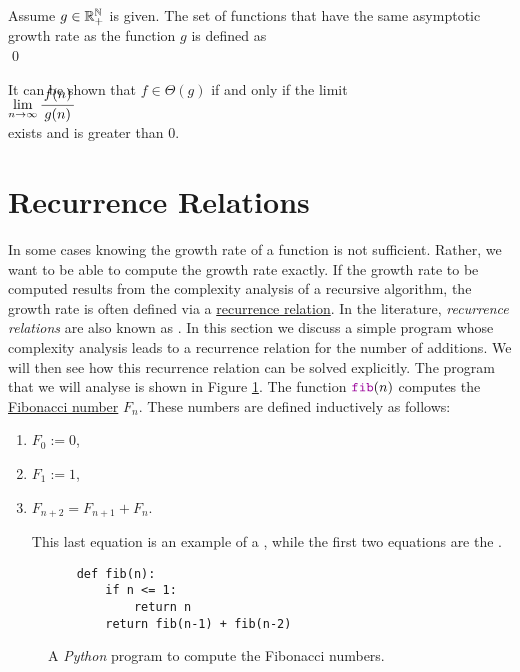 \begin{Definition}[$\Theta(g)$] 
  Assume $g \in {\mathbb R}_+^{{\mathbb N}}$ is given.   The set of functions that have the same asymptotic growth rate
  as the function $g$ is defined as
  \\[0.2cm]
  \hspace*{0.5cm} 
  \colorbox{red}{}
  \qed 
\end{Definition}

\noindent
It can be shown that $f \in \Theta(g)$ if and only if the limit
\\[0.4cm]
\hspace*{1.3cm}
$\lim\limits_{n \rightarrow \infty} \bruch{f(n)}{g(n)}$
\\[0.2cm]
exists and is greater than $0$.

\section{Recurrence Relations}
In some cases knowing the growth rate of a function is not sufficient.  Rather, we want to be able to compute
the growth rate exactly.  If the growth rate to be computed results from the complexity analysis of a recursive
algorithm, the growth rate is often defined via a
\href{https://en.wikipedia.org/wiki/Recurrence_relation}{recurrence relation}.  In the literature,
\emph{recurrence relations} are also known as .
In this section we discuss a simple program whose complexity analysis leads to a recurrence relation for the 
number of additions.  We will then see how this recurrence relation can be solved explicitly.  The program that
we will analyse is shown in Figure \ref{fig:Fibonacci.ipynb}.  The function $\mytt{fib}(n)$ computes the
\href{https://en.wikipedia.org/wiki/Fibonacci_number}{Fibonacci number}  $F_n$.  These
numbers are defined inductively as follows:
\begin{enumerate}
\item $F_0 := 0$,
\item $F_1 := 1$, 
\item $F_{n+2} = F_{n+1} + F_n$.

  This last equation is an example of a , while the first two equations are the
  . 
\end{enumerate}

\begin{figure}[!h]
  \centering
\begin{verbatim}
    def fib(n):
        if n <= 1:
            return n
        return fib(n-1) + fib(n-2)
\end{verbatim}
\vspace*{-0.3cm}
  \caption{A \textsl{Python} program to compute the Fibonacci numbers.}
  \label{fig:Fibonacci.ipynb}
\end{figure} 

